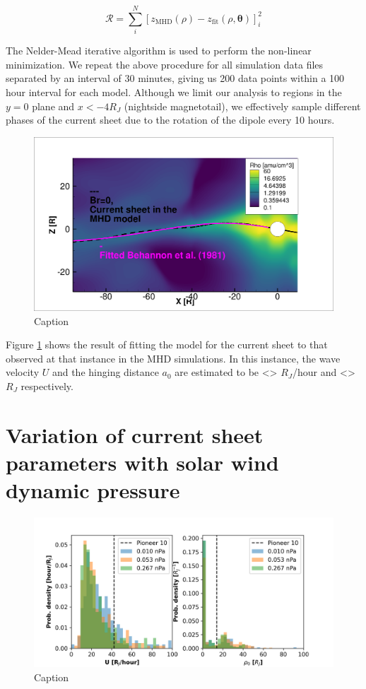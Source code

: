 \begin{equation}
    \mathcal{R} = \sum_i^N \left[ z_\text{MHD}(\rho) - z_\text{fit} (\rho, \boldsymbol\theta) \right]_i^2
\end{equation}

The Nelder-Mead iterative algorithm is used to perform the non-linear minimization. We repeat the above procedure for all simulation data files separated by an interval of 30 minutes, giving us 200 data points within a 100 hour interval for each model. Although we limit our analysis to regions in the $y=0$ plane and $x < -4 R_J$ (nightside magnetotail), we effectively sample different phases of the current sheet due to the rotation of the dipole every 10 hours.

\begin{figure}
    \centering
    \includegraphics[width=\textwidth]{images6/CurrentSheet_fitted.png}
    \caption{Caption}
    \label{fig:example-fitcurrentsheet}
\end{figure}

Figure \ref{fig:example-fitcurrentsheet} shows the result of fitting the  model for the current sheet to that observed at that instance in the MHD simulations. In this instance, the wave velocity $U$ and the hinging distance $a_0$ are estimated to be <> $R_J$/hour and <> $R_J$ respectively. 

\section{Variation of current sheet parameters with solar wind dynamic pressure}

\begin{figure}
    \centering
    \includegraphics[width=\textwidth]{images6/comparison_highdynP_kivelson.png}
    \caption{Caption}
    \label{fig:comparison-hist-kivelson}
\end{figure}

